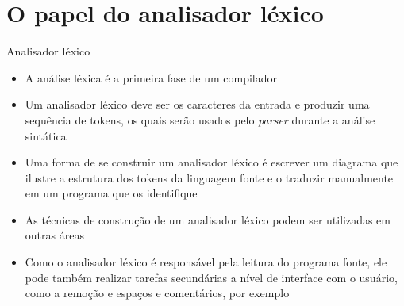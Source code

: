 \section{O papel do analisador léxico}

\begin{frame}[fragile]{Analisador léxico}

    \begin{itemize}
        \item A análise léxica é a primeira fase de um compilador
        \pause

        \item Um analisador léxico deve ser os caracteres da entrada e produzir uma sequência de tokens, os quais serão usados pelo \textit{parser} durante a
            análise sintática
        \pause

        \item Uma forma de se construir um analisador léxico é escrever um diagrama que ilustre a estrutura dos tokens da linguagem fonte e o traduzir manualmente
            em um programa que os identifique
        \pause

        \item As técnicas de construção de um analisador léxico podem ser utilizadas em outras áreas
        \pause

        \item Como o analisador léxico é responsável pela leitura do programa fonte, ele pode também realizar tarefas secundárias a nível de interface com
            o usuário, como a remoção e espaços e comentários, por exemplo
    \end{itemize}

\end{frame}

